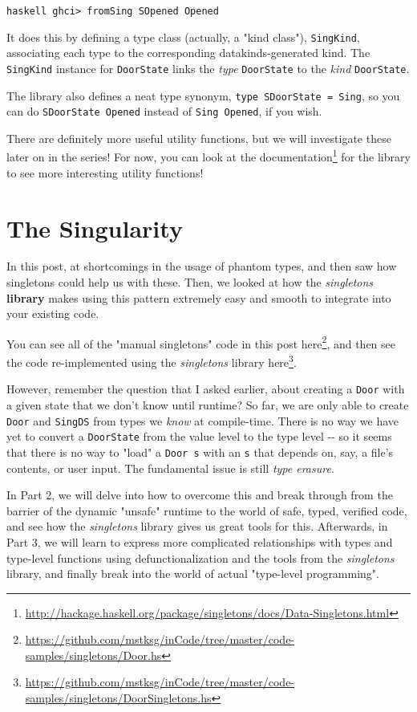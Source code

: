 \documentclass[]{article}
\renewcommand{\href}[2]{#2\footnote{\url{#1}}}
\begin{document}
\texttt{haskell\ ghci\textgreater{}\ fromSing\ SOpened\ Opened}

It does this by defining a type class (actually, a "kind class"),
\texttt{SingKind}, associating each type to the corresponding
datakinds-generated kind. The \texttt{SingKind} instance for \texttt{DoorState}
links the \emph{type} \texttt{DoorState} to the \emph{kind} \texttt{DoorState}.

The library also defines a neat type synonym,
\texttt{type\ SDoorState\ =\ Sing}, so you can do
\texttt{SDoorState\ \textquotesingle{}Opened} instead of
\texttt{Sing\ \textquotesingle{}Opened}, if you wish.

There are definitely more useful utility functions, but we will investigate
these later on in the series! For now, you can look at the
\href{http://hackage.haskell.org/package/singletons/docs/Data-Singletons.html}{documentation}
for the library to see more interesting utility functions!

\section{The Singularity}

In this post, at shortcomings in the usage of phantom types, and then saw how
singletons could help us with these. Then, we looked at how the
\emph{singletons} \textbf{library} makes using this pattern extremely easy and
smooth to integrate into your existing code.

You can see all of the "manual singletons" code in this post
\href{https://github.com/mstksg/inCode/tree/master/code-samples/singletons/Door.hs}{here},
and then see the code re-implemented using the \emph{singletons} library
\href{https://github.com/mstksg/inCode/tree/master/code-samples/singletons/DoorSingletons.hs}{here}.

However, remember the question that I asked earlier, about creating a
\texttt{Door} with a given state that we don't know until runtime? So far, we
are only able to create \texttt{Door} and \texttt{SingDS} from types we
\emph{know} at compile-time. There is no way we have yet to convert a
\texttt{DoorState} from the value level to the type level -\/- so it seems that
there is no way to "load" a \texttt{Door\ s} with an \texttt{s} that depends on,
say, a file's contents, or user input. The fundamental issue is still \emph{type
erasure}.

In Part 2, we will delve into how to overcome this and break through from the
barrier of the dynamic "unsafe" runtime to the world of safe, typed, verified
code, and see how the \emph{singletons} library gives us great tools for this.
Afterwards, in Part 3, we will learn to express more complicated relationships
with types and type-level functions using defunctionalization and the tools from
the \emph{singletons} library, and finally break into the world of actual
"type-level programming".
\end{document}
